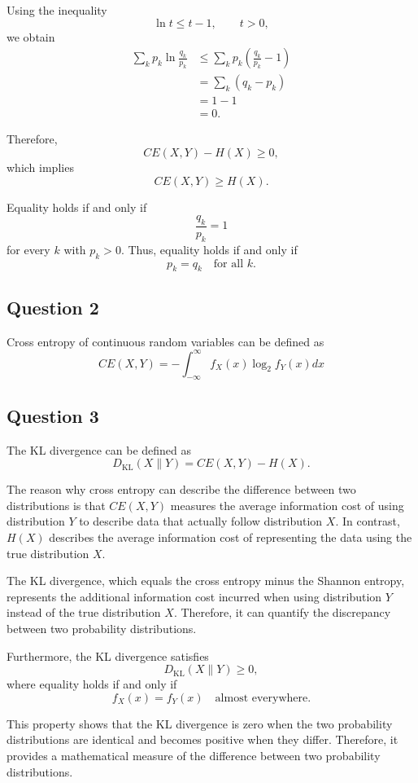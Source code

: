 \documentclass[10pt,a4paper]{article}
\begin{document}
		Using the inequality
		\[
		\ln t\leq t-1,\qquad t>0,
		\]
		we obtain
		\begin{align*}
			\sum_k p_k\ln\frac{q_k}{p_k}
			&\leq \sum_k p_k\left(\frac{q_k}{p_k}-1\right)\\
			&=\sum_k(q_k-p_k)\\
			&=1-1\\
			&=0.
		\end{align*}
		
		Therefore,
		\[
		CE(X,Y)-H(X)\geq 0,
		\]
		which implies
		\[
		\boxed{CE(X,Y)\geq H(X).}
		\]
		
		Equality holds if and only if
		\[
		\frac{q_k}{p_k}=1
		\]
		for every \(k\) with \(p_k>0\). Thus, equality holds if and only if
		\[
		\boxed{p_k=q_k\quad\text{for all }k.}
		\]
		\subsection{Question 2}
		Cross entropy of continuous random variables can be defined as 
		\[
			CE(X, Y) = -\int_{-\infty}^{\infty}f_X(x)\log_2f_Y(x)dx
		\]

		
		\subsection{Question 3}
		
		The KL divergence can be defined as
		\[
		D_{\mathrm{KL}}(X\|Y)=CE(X,Y)-H(X).
		\]
		
		The reason why cross entropy can describe the difference between two distributions is that $CE(X,Y)$ measures the average information cost of using distribution $Y$ to describe data that actually follow distribution $X$. In contrast, $H(X)$ describes the average information cost of representing the data using the true distribution $X$.
		
		The KL divergence, which equals the cross entropy minus the Shannon entropy, represents the additional information cost incurred when using distribution $Y$ instead of the true distribution $X$. Therefore, it can quantify the discrepancy between two probability distributions.
		
		Furthermore, the KL divergence satisfies
		\[
		D_{\mathrm{KL}}(X\|Y)\geq 0,
		\]
		where equality holds if and only if
		\[
		f_X(x)=f_Y(x)
		\quad \text{almost everywhere}.
		\]
		
		This property shows that the KL divergence is zero when the two probability distributions are identical and becomes positive when they differ. Therefore, it provides a mathematical measure of the difference between two probability distributions.
		
\end{document}
